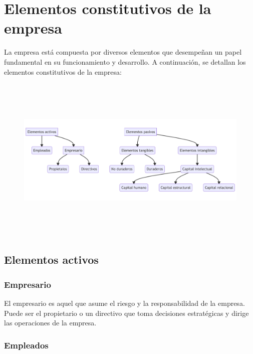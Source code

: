 \documentclass[
  a4paper,
]{article}
\begin{document}
\hypertarget{elementos-constitutivos-de-la-empresa}{%
\section{Elementos constitutivos de la
empresa}\label{elementos-constitutivos-de-la-empresa}}

La empresa está compuesta por diversos elementos que desempeñan un papel
fundamental en su funcionamiento y desarrollo. A continuación, se
detallan los elementos constitutivos de la empresa:

\begin{figure}[H]

{\centering \includegraphics[width=9.98in,height=3.15in]{index_files/figure-latex/mermaid-figure-1.png}

}

\end{figure}

\hypertarget{elementos-activos}{%
\subsection{Elementos activos}\label{elementos-activos}}

\hypertarget{empresario}{%
\subsubsection{Empresario}\label{empresario}}

El empresario es aquel que asume el riesgo y la responsabilidad de la
empresa. Puede ser el propietario o un directivo que toma decisiones
estratégicas y dirige las operaciones de la empresa.

\hypertarget{empleados}{%
\subsubsection{Empleados}\label{empleados}}
\end{document}
